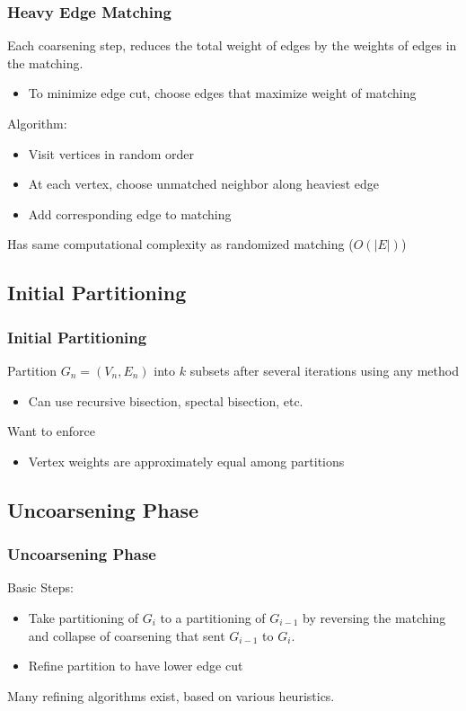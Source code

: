 \documentclass{beamer}
\begin{document}
\begin{frame}
  \frametitle{Heavy Edge Matching}

  Each coarsening step, reduces the total weight of edges by the weights of edges in the matching.
  \begin{itemize}
    \item To minimize edge cut, choose edges that maximize weight of matching
  \end{itemize}

  Algorithm:
  \begin{itemize}
    \item Visit vertices in random order
    \item At each vertex, choose unmatched neighbor along heaviest edge
    \item Add corresponding edge to matching
  \end{itemize}

  Has same computational complexity as randomized matching ($O(|E|)$)
\end{frame}

\subsection{Initial Partitioning}

\begin{frame}
  \frametitle{Initial Partitioning}

  Partition $G_n=(V_n,E_n)$ into $k$ subsets after several iterations using any method
  \begin{itemize}
    \item Can use recursive bisection, spectal bisection, etc.
  \end{itemize}

  Want to enforce
  \begin{itemize}
    \item Vertex weights are approximately equal among partitions
  \end{itemize}

\end{frame}

\subsection{Uncoarsening Phase}

\begin{frame}
  \frametitle{Uncoarsening Phase}

  Basic Steps:
  \begin{itemize}
    \item Take partitioning of $G_i$ to a partitioning of $G_{i-1}$ by reversing the matching and collapse of coarsening that sent $G_{i-1}$ to $G_i$.
    \item Refine partition to have lower edge cut
  \end{itemize}

  Many refining algorithms exist, based on various heuristics.

\end{frame}
\end{document}
